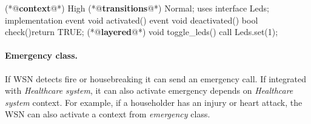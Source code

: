 \documentclass{ubicomp-ext}
\begin{document}

\begin{Sbox}
\begin{minipage}{\marginparwidth}
\begin{csource}
(*@\textbf{context}@*) High {
 (*@\textbf{transitions}@*) Normal;
 uses interface Leds;
}
implementation {
 event void activated(){}
 event void deactivated(){}
 bool check(){return TRUE;}
 (*@\textbf{layered}@*) void toggle_leds(){
  call Leds.set(1);
 }
}
\end{csource}
\end{minipage}
\end{Sbox}



\paragraph{Emergency class.} If WSN detects fire or housebreaking it can send an emergency call. If integrated with \textit{Healthcare system}, it can also activate emergency depends on \textit{Healthcare system} context. For example, if a householder has an injury or heart attack, the WSN can also activate a context from \textit{emergency} class.
\end{document}
